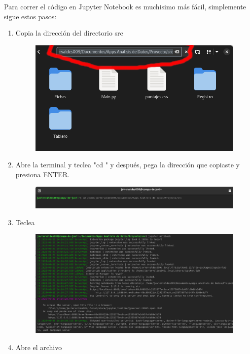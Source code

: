 \documentclass[12pt, Tahoma]{article}
\begin{document}
	
	Para correr el código en Jupyter Notebook es muchisimo más fácil, simplemente sigue estos pasos:
	\begin{enumerate}
		\item Copia la dirección del directorio src 
			\begin{figure}[H]
				\centering
				\includegraphics[scale=2]{correr3.png}
			\end{figure}
		\item Abre la terminal y teclea "cd " y después, pega la dirección que copiaste y presiona ENTER.
			\begin{figure}[H]
				\centering
				\includegraphics[scale=0.4]{correr6.png}
			\end{figure}
		\item Teclea 
			\begin{figure}[H]
				\centering
				\includegraphics[scale=0.3]{correr22.png}
			\end{figure}
		\item Abre el archivo 

\end{enumerate}
\end{document}
